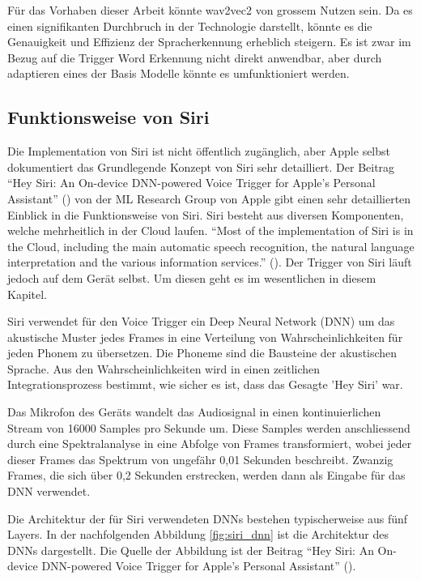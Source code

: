\documentclass[11pt,a4paper]{article}
\begin{document}
\noindent \newline
Für das Vorhaben dieser Arbeit könnte wav2vec2 von grossem Nutzen sein. Da es einen signifikanten
Durchbruch in der Technologie darstellt, könnte es die Genauigkeit und Effizienz der Spracherkennung
erheblich steigern. Es ist zwar im Bezug auf die Trigger Word Erkennung nicht direkt anwendbar, 
aber durch adaptieren eines der Basis Modelle könnte es umfunktioniert werden.


\newpage
\subsection{Funktionsweise von Siri}
Die Implementation von Siri ist nicht öffentlich zugänglich, aber Apple selbst dokumentiert
das Grundlegende Konzept von Siri sehr detailliert. Der Beitrag ``Hey Siri: An On-device DNN-powered
Voice Trigger for Apple’s Personal Assistant'' (\cite{siri2017hey}) von der ML Research Group von
Apple gibt einen sehr detaillierten Einblick in die Funktionsweise von Siri. Siri besteht aus
diversen Komponenten, welche mehrheitlich in der Cloud laufen. ``Most of the implementation of Siri
is in the Cloud, including the main automatic speech recognition, the natural language
interpretation and the various information services.'' (\cite{siri2017hey}). Der Trigger von Siri
läuft jedoch auf dem Gerät selbst. Um diesen geht es im wesentlichen in diesem Kapitel.

\noindent \newline
Siri verwendet für den Voice Trigger ein Deep Neural Network (DNN) um das akustische Muster jedes
Frames in eine Verteilung von Wahrscheinlichkeiten für jeden Phonem zu übersetzen. Die Phoneme sind
die Bausteine der akustischen Sprache. Aus den Wahrscheinlichkeiten wird in einen zeitlichen
Integrationsprozess bestimmt, wie sicher es ist, dass das Gesagte 'Hey Siri' war.

\noindent \newline
Das Mikrofon des Geräts wandelt das Audiosignal in einen kontinuierlichen Stream von 16000 Samples
pro Sekunde um. Diese Samples werden anschliessend durch eine Spektralanalyse in eine Abfolge von
Frames transformiert, wobei jeder dieser Frames das Spektrum von ungefähr 0,01 Sekunden beschreibt.
Zwanzig Frames, die sich über 0,2 Sekunden erstrecken, werden dann als Eingabe für das DNN
verwendet.

\noindent \newline
Die Architektur der für Siri verwendeten DNNs bestehen typischerweise aus fünf Layers. In der
nachfolgenden Abbildung \ref{fig:siri_dnn} ist die Architektur des DNNs dargestellt. Die Quelle der
Abbildung ist der Beitrag ``Hey Siri: An On-device DNN-powered Voice Trigger for Apple’s Personal
Assistant'' (\cite{siri2017hey}).
\end{document}
